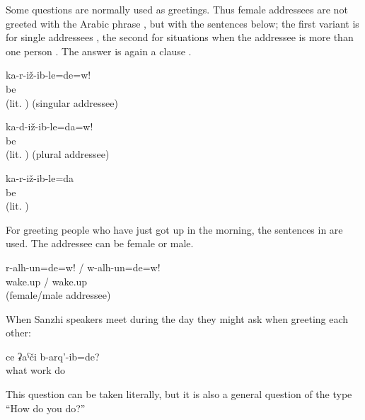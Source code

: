 Some questions are normally used as greetings. Thus female addressees are not greeted with the Arabic phrase , but with the sentences below; the first variant is for single addressees , the second for situations when the addressee is more than one person . The answer is again a clause .
%
\begin{exe}
	\ex	\label{ex:Are you sitting? I am sitting}
	\begin{xlist}
		\ex	\label{ex:Are you sitting? I am sitting@A}
		\gll	ka-r-iž-ib-le=de=w!	\\
			be		\\
		\glt	{} (lit. ) (singular addressee)

		\ex	\label{ex:Are you sitting? I am sitting@C}
		\gll		ka-d-iž-ib-le=da=w!\\
			 be	\\
		\glt	{} (lit. ) (plural addressee)
		
		\ex	\label{ex:Are you sitting? I am sitting@B}
		\gll	ka-r-iž-ib-le=da\\
			be\\
		\glt	{} (lit. )
	\end{xlist}
\end{exe}

For greeting people who have just got up in the morning, the sentences in  are used. The addressee can be female or male.
%
\begin{exe}
	\ex	\label{ex:Good morning}
	\gll	r-alh-un=de=w!	/	w-alh-un=de=w!\\
		wake.up	/	wake.up\\
	\glt	{} (female\slash male addressee)
\end{exe}

When Sanzhi speakers meet during the day they might ask when greeting each other:
%
\begin{exe}
	\ex	\label{ex:What (work) have you done?}
	\gll	ce	ʡaˁči	b-arq'-ib=de?\\
		what	work	do\\
	\glt	{}
\end{exe}

This question can be taken literally, but it is also a general question of the type ``How do you do?''

